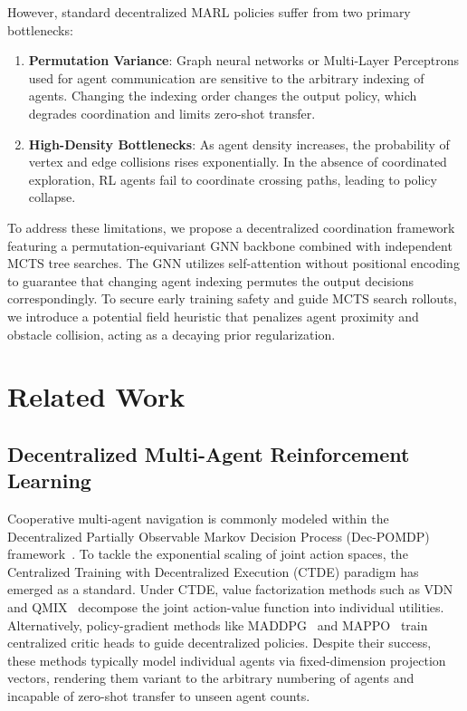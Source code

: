 \documentclass[11pt,a4paper]{article}
\begin{document}
However, standard decentralized MARL policies suffer from two primary bottlenecks:
\begin{enumerate}
    \item \textbf{Permutation Variance}: Graph neural networks or Multi-Layer Perceptrons used for agent communication are sensitive to the arbitrary indexing of agents. Changing the indexing order changes the output policy, which degrades coordination and limits zero-shot transfer.
    \item \textbf{High-Density Bottlenecks}: As agent density increases, the probability of vertex and edge collisions rises exponentially. In the absence of coordinated exploration, RL agents fail to coordinate crossing paths, leading to policy collapse.
\end{enumerate}

To address these limitations, we propose a decentralized coordination framework featuring a permutation-equivariant GNN backbone combined with independent MCTS tree searches. The GNN utilizes self-attention without positional encoding to guarantee that changing agent indexing permutes the output decisions correspondingly. To secure early training safety and guide MCTS search rollouts, we introduce a potential field heuristic that penalizes agent proximity and obstacle collision, acting as a decaying prior regularization.

\section{Related Work}
\subsection{Decentralized Multi-Agent Reinforcement Learning}
Cooperative multi-agent navigation is commonly modeled within the Decentralized Partially Observable Markov Decision Process (Dec-POMDP) framework~\cite{bernstein2002complexity}. To tackle the exponential scaling of joint action spaces, the Centralized Training with Decentralized Execution (CTDE) paradigm has emerged as a standard. Under CTDE, value factorization methods such as VDN~\cite{sunehag2017value} and QMIX~\cite{rashid2018qmix} decompose the joint action-value function into individual utilities. Alternatively, policy-gradient methods like MADDPG~\cite{lowe2017multi} and MAPPO~\cite{yu2021surprising} train centralized critic heads to guide decentralized policies. Despite their success, these methods typically model individual agents via fixed-dimension projection vectors, rendering them variant to the arbitrary numbering of agents and incapable of zero-shot transfer to unseen agent counts.
\end{document}
